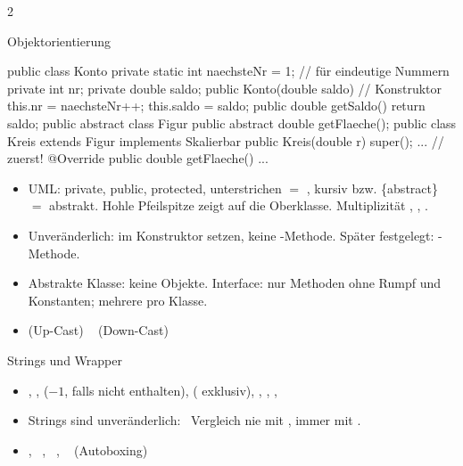 \documentclass[fontsize=10pt,a4paper,DIV=20,headsepline]{scrartcl}
\newenvironment{kl}{\begin{itemize}[leftmargin=3mm, itemsep=0.1mm, topsep=0.3mm, parsep=0pt, label=\textcolor{diagramm}{\textbullet}]}{\end{itemize}}
\begin{document}
\begin{multicols}{2}
\begin{fs}{Objektorientierung}
\begin{fscode}
public class Konto {
	private static int naechsteNr = 1;   // für eindeutige Nummern
	private int nr;
	private double saldo;
	public Konto(double saldo) {   // Konstruktor
		this.nr = naechsteNr++;
		this.saldo = saldo;
	}
	public double getSaldo() { return saldo; }
}
public abstract class Figur {
	public abstract double getFlaeche();
}
public class Kreis extends Figur implements Skalierbar {
	public Kreis(double r) { super(); ... }   // zuerst!
	@Override public double getFlaeche() { ... }
}
\end{fscode}
\begin{kl}
\item UML: \code{-} private, \code{+} public, \code{\#} protected, unterstrichen $=$ , kursiv bzw. \{abstract\} $=$ abstrakt. Hohle Pfeilspitze zeigt auf die Oberklasse. Multiplizität , \code{*}, .
\item Unveränderlich: im Konstruktor setzen, keine -Methode. Später festgelegt: -Methode.
\item Abstrakte Klasse: keine Objekte. Interface: nur Methoden ohne Rumpf und Konstanten; mehrere pro Klasse.
\item {} (Up-Cast) \  (Down-Cast) \ 
\end{kl}
\end{fs}

\begin{fs}{Strings und Wrapper}
\begin{kl}
\item {}, ,  ($-1$, falls nicht enthalten),  ( exklusiv), , , , 
\item Strings sind unveränderlich:  \ Vergleich nie mit \code{==}, immer mit .
\item {}, \ , \ , \  (Autoboxing)
\end{kl}
\end{fs}

\end{multicols}
\end{document}
